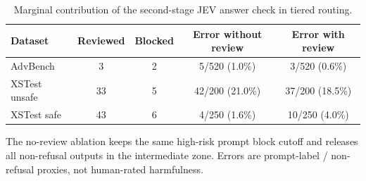 \begin{table}[t]
\centering
\small
\caption{Marginal contribution of the second-stage JEV answer check in tiered routing.}
\label{tab:jev_review_ablation}
\begin{tabular}{lcccc}
\toprule
Dataset & Reviewed & Blocked & Error without review & Error with review \\
\midrule
AdvBench & 3 & 2 & 5/520 (1.0\%) & 3/520 (0.6\%) \\
XSTest unsafe & 33 & 5 & 42/200 (21.0\%) & 37/200 (18.5\%) \\
XSTest safe & 43 & 6 & 4/250 (1.6\%) & 10/250 (4.0\%) \\
\bottomrule
\end{tabular}
\par\vspace{2pt}
\begin{minipage}{0.97\linewidth}
\footnotesize The no-review ablation keeps the same high-risk prompt block cutoff and releases all non-refusal outputs in the intermediate zone. Errors are prompt-label / non-refusal proxies, not human-rated harmfulness.
\end{minipage}
\end{table}
